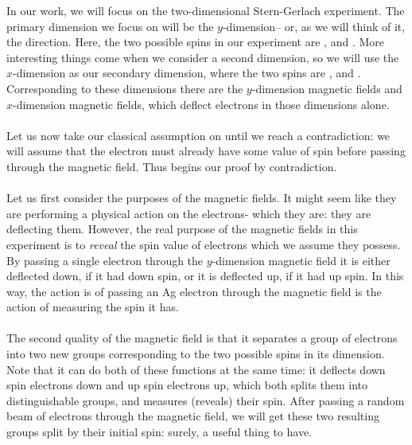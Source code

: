 In our work, we will focus on the two-dimensional Stern-Gerlach experiment. The primary dimension we focus on will be the $y$-dimension-- or, as we will think of it, the  direction. Here, the two possible spins in our experiment are , and . More interesting things come when we consider a second dimension, so we will use the $x$-dimension as our secondary dimension, where the two spins are , and . Corresponding to these dimensions there are the $y$-dimension magnetic fields and $x$-dimension magnetic fields, which deflect electrons in those dimensions alone.
\\\\
Let us now take our classical assumption on until we reach a contradiction: we will assume that the electron must already have some value of spin before passing through the magnetic field. Thus begins our proof by contradiction.
\\\\
Let us first consider the purposes of the magnetic fields. It might seem like they are performing a physical action on the electrons- which they are: they are deflecting them. However, the real purpose of the magnetic fields in this experiment is to \textit{reveal} the spin value of electrons which we assume they possess. By passing a single electron through the $y$-dimension magnetic field it is either deflected down, if it had down spin, or it is deflected up, if it had up spin. In this way, the action is of passing an Ag electron through the magnetic field is the action of measuring the spin it has. 
\\\\
The second quality of the magnetic field is that it separates a group of electrons into two new groups corresponding to the two possible spins in its dimension. Note that it can do both of these functions at the same time: it deflects down spin electrons down and up spin electrons up, which both splits them into distinguishable groups, and measures (reveals) their spin. After passing a random beam of electrons through the magnetic field, we will get these two resulting groups split by their initial spin: surely, a useful thing to have. 
\\\\
